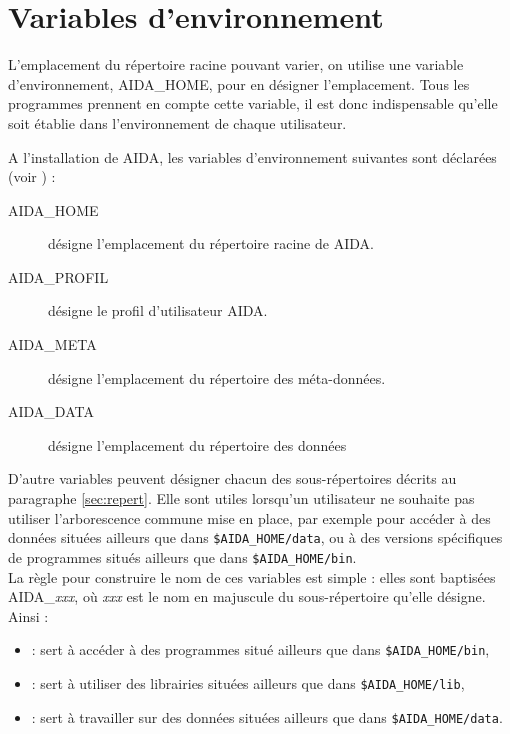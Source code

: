 \section{Variables d'environnement}
   L'emplacement du répertoire racine pouvant varier, on utilise une 
variable d'environnement, \textsf{AIDA\_HOME}, pour en 
désigner l'emplacement. Tous les programmes prennent en compte cette
variable, il est donc indispensable qu'elle soit établie dans 
l'environnement de chaque utilisateur.

   A l'installation de AIDA, les variables d'environnement suivantes sont
déclarées (voir ) :
\begin{description}
  \item[\textsf{AIDA\_HOME}] désigne l'emplacement du répertoire racine de AIDA.
  \item[\textsf{AIDA\_PROFIL}] désigne le profil d'utilisateur AIDA.
  \item[\textsf{AIDA\_META}] désigne l'emplacement du répertoire des
   méta-données.
  \item[\textsf{AIDA\_DATA}] désigne l'emplacement du répertoire des données
\end{description}

\medbreak
   D'autre variables peuvent désigner chacun des sous-répertoires
décrits au paragraphe \ref{sec:repert}. Elle sont utiles lorsqu'un
utilisateur ne souhaite pas utiliser l'arborescence commune mise en place,
par exemple pour accéder à des données situées ailleurs que dans
\texttt{\$AIDA\_HOME\//data}, ou à des versions spécifiques
de programmes situés ailleurs que dans \texttt{\$AIDA\_HOME\//bin}.\\
La règle pour construire le nom de ces variables est simple : elles sont
baptisées \textsf{AIDA\_\textit{xxx}}, où \textit{xxx} est le nom en majuscule
du sous-répertoire qu'elle désigne. \\
Ainsi :
\begin{itemize}
  \item[\texttt{AIDA\_BIN}] : sert à accéder à des programmes situé ailleurs
    que dans \texttt{\$AIDA\_HOME\//bin},
  \item[\texttt{AIDA\_LIB}] : sert à utiliser des librairies situées ailleurs
    que dans \texttt{\$AIDA\_HOME\//lib},
  \item[\texttt{AIDA\_DATA}] : sert à travailler sur des données situées
   ailleurs que dans \texttt{\$AIDA\_HOME\//data}.
\end{itemize}

